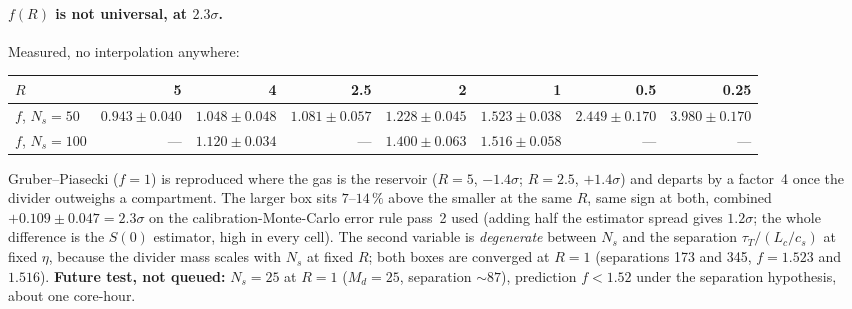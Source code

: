 \documentclass[11pt,a4paper]{article}
\begin{document}
\paragraph{$f(R)$ is not universal, at $2.3\sigma$.} Measured, no interpolation anywhere:
\begin{center}\small
\begin{tabular}{@{}lrrrrrrr@{}}
\toprule
$R$ & 5 & 4 & 2.5 & 2 & 1 & 0.5 & 0.25 \\
\midrule
$f$, $N_s = 50$  & $0.943 \pm 0.040$ & $1.048 \pm 0.048$ & $1.081 \pm 0.057$ & $1.228 \pm 0.045$ & $1.523 \pm 0.038$ & $2.449 \pm 0.170$ & $3.980 \pm 0.170$ \\
$f$, $N_s = 100$ & --- & $1.120 \pm 0.034$ & --- & $1.400 \pm 0.063$ & $1.516 \pm 0.058$ & --- & --- \\
\bottomrule
\end{tabular}
\end{center}
Gruber--Piasecki ($f = 1$) is reproduced where the gas is the reservoir ($R = 5$, $-1.4\sigma$;
$R = 2.5$, $+1.4\sigma$) and departs by a factor~4 once the divider outweighs a compartment. The
larger box sits $7$--$14\,\%$ above the smaller at the same $R$, same sign at both, combined
$+0.109 \pm 0.047 = 2.3\sigma$ on the calibration-Monte-Carlo error rule pass~2 used (adding half the
estimator spread gives $1.2\sigma$; the whole difference is the $S(0)$ estimator, high in every
cell). The second variable is \emph{degenerate} between $N_s$ and the separation
$\tau_T/(L_c/c_s)$ at fixed $\eta$, because the divider mass scales with $N_s$ at fixed $R$; both
boxes are converged at $R = 1$ (separations 173 and 345, $f = 1.523$ and $1.516$). \textbf{Future
test, not queued:} $N_s = 25$ at $R = 1$ ($M_d = 25$, separation $\sim 87$), prediction $f < 1.52$
under the separation hypothesis, about one core-hour.
\end{document}
